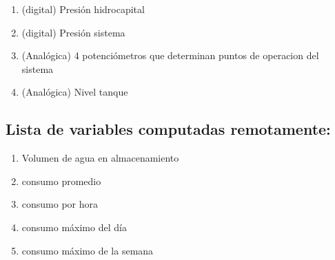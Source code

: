 \documentclass[12pt]{article}
\begin{document}
	\begin{enumerate}
		\item (digital) Presión hidrocapital
		\item (digital) Presión sistema
		\item (Analógica) 4 potenciómetros que determinan puntos de operacion del sistema
		\item (Analógica) Nivel tanque
	\end{enumerate}
	
	\subsection{Lista de variables computadas remotamente:}
	
	\begin{enumerate}
		\item Volumen de agua en almacenamiento
		\item consumo promedio
		\item consumo por hora
		\item consumo máximo del día
		\item consumo máximo de la semana
	\end{enumerate}
	
\end{document}
